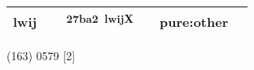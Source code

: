 \documentclass[14pt,a4paper]{scrartcl}
\begin{document}
\begin{longtable}[c]{@{}llllll@{}}
\begin{minipage}[t]{0.14\columnwidth}
lwij
\strut\end{minipage} &
\begin{minipage}[t]{0.14\columnwidth}\raggedright\strut
\strut\end{minipage} &
\begin{minipage}[t]{0.14\columnwidth}\raggedright\strut
𧮢\textsuperscript{27ba2~lwijX}
\strut\end{minipage} &
\begin{minipage}[t]{0.14\columnwidth}\raggedright\strut
\strut\end{minipage} &
\begin{minipage}[t]{0.14\columnwidth}\raggedright\strut
pure:other
\strut\end{minipage}\tabularnewline
\bottomrule
\end{longtable}

(163) 0579 {[}2{]}
\end{document}
